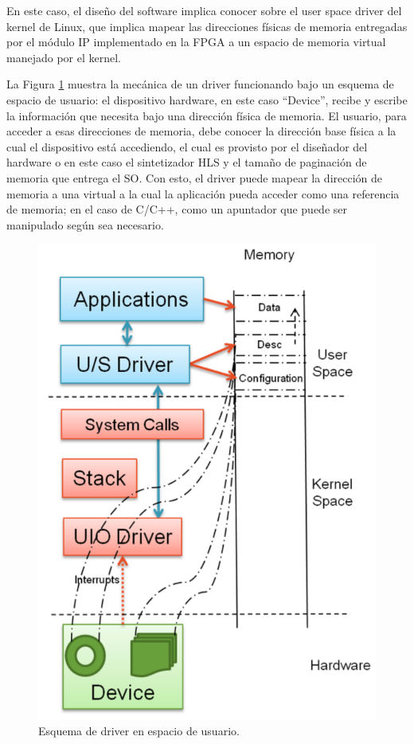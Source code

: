 En este caso, el diseño del software implica conocer sobre el user space driver del kernel de Linux, que implica mapear las direcciones físicas de memoria entregadas por el módulo IP implementado en la FPGA a un espacio de memoria virtual manejado por el kernel.

La Figura \ref{fig:userSpaceDriver} muestra la mecánica de un driver funcionando bajo un esquema de espacio de usuario: el dispositivo hardware, en este caso ``Device'', recibe y escribe la información que necesita bajo una dirección física de memoria. El usuario, para acceder a esas direcciones de memoria, debe conocer la dirección base física a la cual el dispositivo está accediendo, el cual es provisto por el diseñador del hardware o en este caso el sintetizador HLS y el tamaño de paginación de memoria que entrega el SO. Con esto, el driver puede mapear la dirección de memoria a una virtual a la cual la aplicación pueda acceder como una referencia de memoria; en el caso de C/C++, como un apuntador que puede ser manipulado según sea necesario.

\begin{figure}[!ht]
	\centering
		\includegraphics[scale=0.5]{Figures/UserSpaceDriver}
	\caption{Esquema de driver en espacio de usuario\cite{userSpaceDriver}.}
	\label{fig:userSpaceDriver}
\end{figure}

